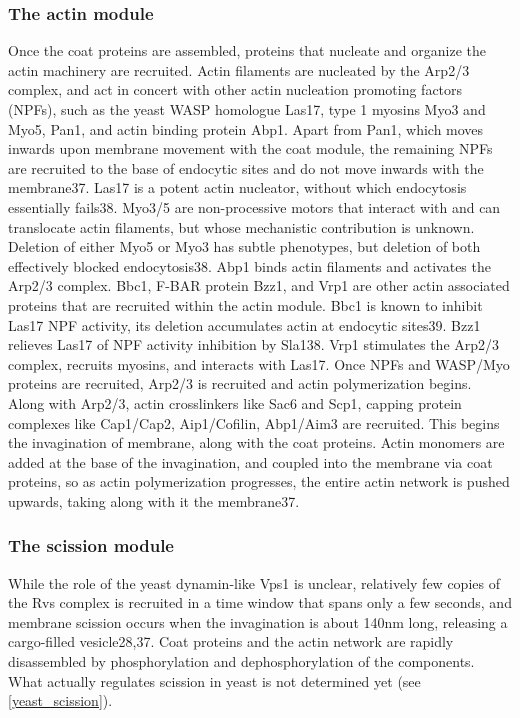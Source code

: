 			\subsubsection{The actin module}
			Once the coat proteins are assembled, proteins that nucleate and organize the actin machinery are recruited. Actin filaments are nucleated by the Arp2/3 complex, and act in concert with other actin nucleation promoting factors (NPFs), such as the yeast WASP homologue Las17, type 1 myosins Myo3 and Myo5, Pan1, and actin binding protein Abp1. Apart from Pan1, which moves inwards upon membrane movement with the coat module, the remaining NPFs are recruited to the base of endocytic sites and do not move inwards with the membrane37. 
			\vspace{5mm}
			Las17 is a potent actin nucleator, without which endocytosis essentially fails38. Myo3/5 are non-processive motors that interact with and can translocate actin filaments, but whose mechanistic contribution is unknown. Deletion of either Myo5 or Myo3 has subtle phenotypes, but deletion of both effectively blocked endocytosis38. Abp1 binds actin filaments and activates the Arp2/3 complex. 
			\vspace{5mm}
			Bbc1, F-BAR protein Bzz1, and Vrp1 are other actin associated proteins that are recruited within the actin module. Bbc1 is known to inhibit Las17 NPF activity, its deletion accumulates actin at endocytic sites39. Bzz1 relieves Las17 of NPF activity inhibition by Sla138. Vrp1 stimulates the Arp2/3 complex, recruits myosins, and interacts with Las17. 
			\vspace{5mm}
			Once NPFs and WASP/Myo proteins are recruited, Arp2/3 is recruited and actin polymerization begins. Along with Arp2/3, actin crosslinkers like Sac6 and Scp1, capping protein complexes like Cap1/Cap2, Aip1/Cofilin, Abp1/Aim3 are recruited. This begins the invagination of membrane, along with the coat proteins. Actin monomers are added at the base of the invagination, and coupled into the membrane via coat proteins, so as actin polymerization progresses, the entire actin network is pushed upwards, taking along with it the membrane37.

			\subsubsection{The scission module}
			While the role of the yeast dynamin-like Vps1 is unclear, relatively few copies of the Rvs complex is recruited in a time window that spans only a few seconds, and membrane scission occurs when the invagination is about 140nm long, releasing a cargo-filled vesicle28,37. Coat proteins and the actin network are rapidly disassembled by phosphorylation and dephosphorylation of the components. What actually regulates scission in yeast is not determined yet (see \ref{yeast_scission}).

